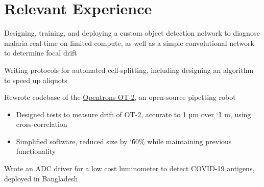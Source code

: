 \documentclass[]{deedy-resume-openfont}
\begin{document}

\vspace{12pt}

\section{Relevant Experience}

\begin{tightemize}


\item Designing, training, and deploying a custom object detection network to diagnose malaria real-time on limited compute, as well as a simple convolutional network to determine focal drift
\item Writing protocols for automated cell-splitting, including designing an algorithm to speed up aliquots
\end{tightemize}

\begin{tightemize}
\item Rewrote codebase of the \href{https://opentrons.com/ot-2/}{Opentrons OT-2}, an open-source pipetting robot
  \begin{itemize}
    \item Designed tests to measure drift of OT-2, accurate to 1 µm over \char`\~ 1 m, using cross-correlation
    \item Simplified software, reduced size by \char`\~ 60\% while maintaining previous functionality
  \end{itemize}
\item Wrote an ADC driver for a low cost luminometer to detect COVID-19 antigens, deployed in Bangladesh
\end{tightemize}

\vspace{8pt}
\end{document}
